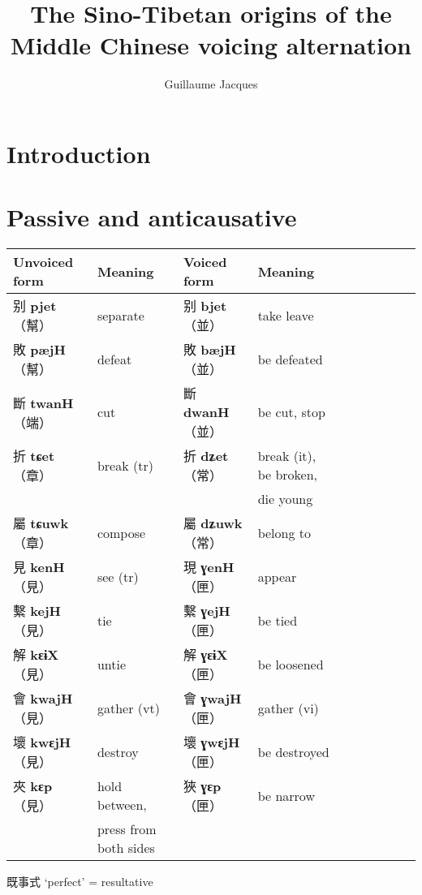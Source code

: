 \documentclass[oneside,a4paper,11pt]{article}
\newcommand{\ipa}[1]{\textbf{{\phon\mbox{#1}}}} %
\newcommand{\zh}[1]{{\cn #1}}
\newcommand{\zhc}[2]{\zh{#1} \ipa{#2}}
\newcommand{\mc}[1]{\zh{（#1）}}
\begin{document}
\title{The Sino-Tibetan origins of the Middle Chinese voicing alternation}
\author{Guillaume Jacques}
\maketitle

 \section*{Introduction}
 \section{Passive and anticausative}
 \citet[79-80]{zhou62goucibian}
\begin{table}[H]
\begin{tabular}{llllllllll}
\toprule
Unvoiced form &Meaning & Voiced form & Meaning\\
\midrule
\zhc{别}{pjet} \mc{幫}	&separate & \zhc{别}{bjet} \mc{並} & take leave \\
\zhc{敗}{pæjH} \mc{幫}	&defeat & \zhc{敗}{bæjH} \mc{並} & be defeated \\
\midrule
\zhc{斷}{twanH} \mc{端}	&cut & \zhc{斷}{dwanH} \mc{並} & be cut, stop \\
\midrule
\zhc{折}{tɕet} \mc{章}	&break (tr) & \zhc{折}{dʑet} \mc{常} &break (it), be broken, \\
&&&die young \\
\zhc{屬}{tɕuwk} \mc{章}	&compose & \zhc{屬}{dʑuwk} \mc{常} &belong to \\
\midrule 
\zhc{見}{kenH} \mc{見}	&see (tr) & \zhc{現}{ɣenH} \mc{匣} & appear \\
\zhc{繫}{kejH} \mc{見}	&tie & \zhc{繫}{ɣejH} \mc{匣} & be tied \\
\zhc{解}{kɛɨX} \mc{見}	&untie & \zhc{解}{ɣɛɨX} \mc{匣} & be loosened \\
\zhc{會}{kwajH} \mc{見}	&gather (vt) & \zhc{會}{ɣwajH} \mc{匣} & gather (vi) \\
\zhc{壞}{kwɛjH} \mc{見}	&destroy  & \zhc{壞}{ɣwɛjH} \mc{匣} & be destroyed \\
\zhc{夾}{kɛp} \mc{見}	&hold between,   & \zhc{狹}{ɣɛp} \mc{匣} & be narrow \\
&press from both sides&&\\
\bottomrule
\end{tabular}
\end{table}

\zh{既事式}  `perfect' = resultative  \citet[86]{zhou62goucibian}
\end{document}
